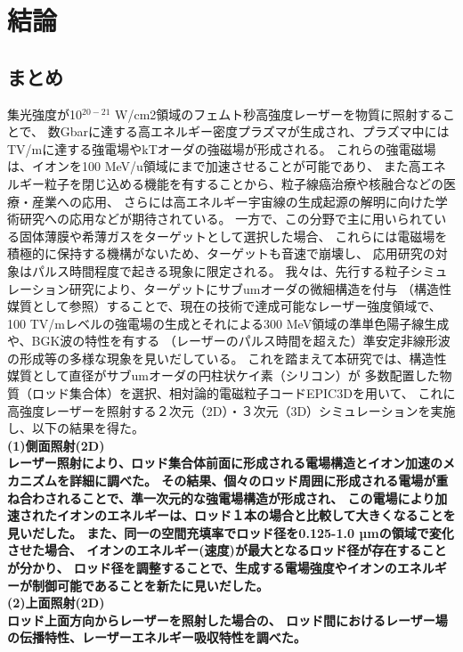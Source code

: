 \documentclass[a4paper,11pt,titlepage]{jsarticle}
\begin{document}
    \section{結論}
    \subsection{まとめ}
    集光強度が10$^{20-21}$ W/cm2領域のフェムト秒高強度レーザーを物質に照射することで、
    数Gbarに達する高エネルギー密度プラズマが生成され、プラズマ中にはTV/mに達する強電場やkTオーダの強磁場が形成される。
    これらの強電磁場は、イオンを100 MeV/u領域にまで加速させることが可能であり、
    また高エネルギー粒子を閉じ込める機能を有することから、粒子線癌治療や核融合などの医療・産業への応用、
    さらには高エネルギー宇宙線の生成起源の解明に向けた学術研究への応用などが期待されている。
    一方で、この分野で主に用いられている固体薄膜や希薄ガスをターゲットとして選択した場合、
    これらには電磁場を積極的に保持する機構がないため、ターゲットも音速で崩壊し、
    応用研究の対象はパルス時間程度で起きる現象に限定される。
    我々は、先行する粒子シミュレーション研究により、ターゲットにサブumオーダの微細構造を付与
    （構造性媒質として参照）することで、現在の技術で達成可能なレーザー強度領域で、
    100 TV/mレベルの強電場の生成とそれによる300 MeV領域の準単色陽子線生成や、BGK波の特性を有する
    （レーザーのパルス時間を超えた）準安定非線形波の形成等の多様な現象を見いだしている。
    これを踏まえて本研究では、構造性媒質として直径がサブumオーダの円柱状ケイ素（シリコン）が
    多数配置した物質（ロッド集合体）を選択、相対論的電磁粒子コードEPIC3Dを用いて、
    これに高強度レーザーを照射する２次元（2D）・３次元（3D）シミュレーションを実施し、以下の結果を得た。\\
    \bf
    (1)側面照射(2D)\\
    \rm
    レーザー照射により、ロッド集合体前面に形成される電場構造とイオン加速のメカニズムを詳細に調べた。
    その結果、個々のロッド周囲に形成される電場が重ね合わされることで、準一次元的な強電場構造が形成され、
    この電場により加速されたイオンのエネルギーは、ロッド１本の場合と比較して大きくなることを見いだした。
    また、同一の空間充填率でロッド径を0.125-1.0 µmの領域で変化させた場合、
    イオンのエネルギー(速度)が最大となるロッド径が存在することが分かり、
    ロッド径を調整することで、生成する電場強度やイオンのエネルギーが制御可能であることを新たに見いだした。\\
    \bf
    (2)上面照射(2D)\\
    \rm
    ロッド上面方向からレーザーを照射した場合の、
    ロッド間におけるレーザー場の伝播特性、レーザーエネルギー吸収特性を調べた。
\end{document}
